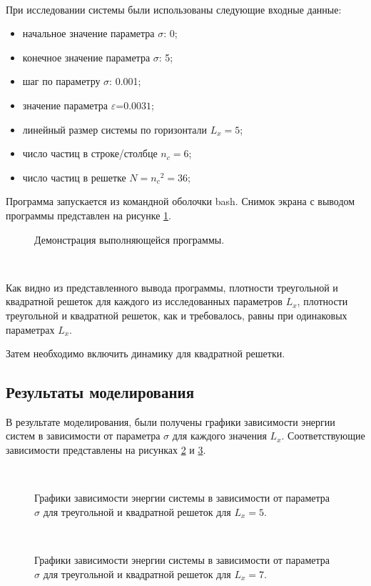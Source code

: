 \documentclass[14pt,a4paper,report]{ncc}
\begin{document}
\ 

При исследовании системы были использованы следующие входные данные:
\begin{itemize}
\item начальное значение параметра $\sigma$: 0;
\item конечное значение параметра $\sigma$: 5;
\item шаг по параметру $\sigma$: 0.001;
\item значение параметра $\varepsilon$=$0.0031$;
\item линейный размер системы по горизонтали ${L_x=5}$;
\item число частиц в строке/столбце ${n_c=6}$;
\item число частиц в решетке ${N={n_c}^2=36}$;
\end{itemize}

Программа запускается из командной оболочки bash. Снимок экрана с выводом программы представлен на рисунке \ref{ris:image3}.
\

\begin{figure}[h]
\caption{Демонстрация выполняющейся программы.}
\label{ris:image3}
\end{figure}
\

Как видно из представленного вывода программы, плотности треугольной и квадратной решеток для каждого из исследованных параметров $L_x$, плотности треугольной и квадратной решеток, как и требовалось, равны при одинаковых параметрах $L_x$.
\

Затем необходимо включить динамику для квадратной решетки. 

 \subsection{Результаты моделирования}
В результате моделирования, были получены графики зависимости энергии систем в зависимости от параметра $\sigma$ для каждого значения $L_x$. Соответствующие зависимости представлены на рисунках \ref{ris:image4} и \ref{ris:image5}.


 \
 
 \begin{figure}[h]
\caption{Графики зависимости энергии системы в зависимости от параметра $\sigma$ для треугольной и квадратной решеток для $L_x=5$.}
\label{ris:image4}
\end{figure}
\

  \begin{figure}[h]
\caption{Графики зависимости энергии системы в зависимости от параметра $\sigma$ для треугольной и квадратной решеток для $L_x=7$.}
\label{ris:image5}
\end{figure}
\
\end{document}
